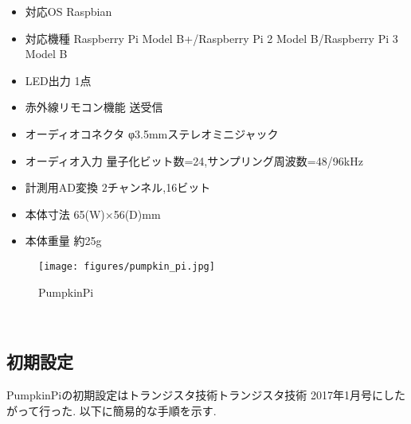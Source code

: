 \begin{itemize}
\tightlist
\item
  対応OS Raspbian
\item
  対応機種 Raspberry Pi Model B+/Raspberry Pi 2 Model B/Raspberry Pi 3
  Model B
\item
  LED出力 1点
\item
  赤外線リモコン機能 送受信
\item
  オーディオコネクタ φ3.5mmステレオミニジャック
\item
  オーディオ入力 量子化ビット数=24,サンプリング周波数=48/96kHz
\item
  計測用AD変換 2チャンネル,16ビット
\item
  本体寸法 65(W)×56(D)mm
\item
  本体重量 約25g
\end{itemize}

\begin{figure}[H]
\centering
\texttt{[image: figures/pumpkin\_pi.jpg]}
\label{fig:pumpkin_pi}
\caption{PumpkinPi}
\end{figure}

\
\subsection{初期設定}\label{adc-setup}

PumpkinPiの初期設定はトランジスタ技術トランジスタ技術
2017年1月号\cite{transistor:online}にしたがって行った. 以下に簡易的な手順を示す. 

